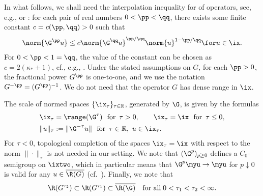 \documentclass[10pt]{article}
\theoremstyle{definition}
\begin{document}
In what follows, we shall need
the interpolation inequality for \fracpowers of operators, see, e.g.,
\cite{Komatsu66} or
\cite[Proposition 6.6.4]{Haase06}:
for each pair of real numbers \linebreak $ 0 < \pp < \qq $,
there exists some finite constant $ c =c(\pp,\qq) > 0 $ such that
%
\begin{align}
\norm{ \G^\pp u }
\le c \norm{\G^\qq u}^{\pp/\qq} \norm{ u }^{1-\pp/\qq}
\for u \in \ix.
\label{eq:interpol2}
\end{align}
%
For $ 0 < \pp < 1 = \qq $, the value of the constant can be chosen as $ c = 2(\kappa_* + 1)$, cf., e.g., \cite[Corollary 1.1.19]{Plato95}.
Under the stated assumptions on $G$, for each $\pp > 0 $, the fractional power
$ G^{\pp} $ is one-to-one, and we use the notation
$ G^{-\pp} = (G^\pp)^{-1} $.
We do not need that the operator $ G $ has dense range in $ \ix $.

The scale of normed spaces $\{\ix_\tau\}_{\tau \in \mathbb{R}}$,
generated by $\G$, is given by the formulas
%
\begin{align}
& \ix_\tau=\range(\G^\tau) \ \textup{ for }\, \tau > 0, \qquad
\ix _\tau= \ix \ \textup{ for }\, \tau \le 0, \nonumber \\
& \|u\|_\tau:=\|\G^{-\tau} u\| \ \textup{ for }\, \tau \in \mathbb{R}, \ u \in \ix_\tau.
\label{eq:taunorm}
\end{align}
%
For $ \tau < 0 $, topological completion of the spaces
$\ix_\tau = \ix$ with respect to the norm $ \|\cdot\|_\tau $ is not needed in our setting.
%
We note that $ (\G^p)_{p\ge 0} $ defines a $ C_0 $-semigroup on
$ \ixtwo $,
which in particular means that $ \G^p \myu \to \myu $ for $ p \downarrow 0 $ is valid for any
$ u \in \overline{\R(G)} $ (cf.~\cite[Proposition 3.1.15]{Haase06}). Finally, we note that
\begin{equation} \label{eq:chain1}
\R(G^{\tau_2}) \subset\R(G^{\tau_1}) \subset \overline{\R(\G)} \quad \mbox{for all} \;0 < \tau_1 < \tau_2 < \infty.
\end{equation}
%
%
\end{document}
